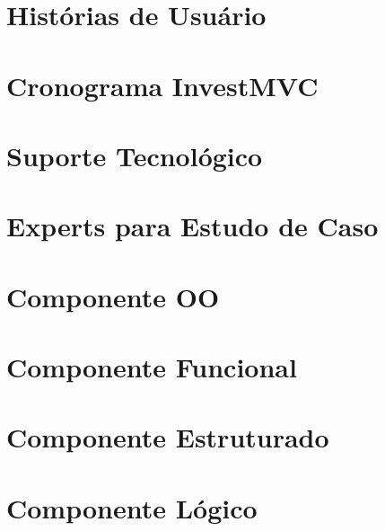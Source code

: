 \begin{apendicesenv}

\partapendices

\chapter{Histórias de Usuário}
\label{ap:us}


\chapter{Cronograma InvestMVC}
\label{ap:cronograma}


\chapter{Suporte Tecnológico}
\label{ap:suporte}


\chapter{Experts para Estudo de Caso}
\label{ap:experts}


\chapter{Componente OO}
\label{ap:oo}


\chapter{Componente Funcional}
\label{ap:funcional}



\chapter{Componente Estruturado}
\label{ap:estruturado}


\chapter{Componente Lógico}
\label{ap:logico}




\end{apendicesenv}
